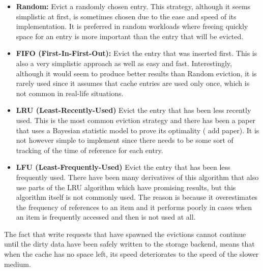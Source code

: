%
\begin{itemize}
	\item \textbf{Random:} Evict a randomly chosen entry. This strategy, 
		although it seems simplistic at first, is sometimes chosen due 
		to the ease and speed of its implementation. It is preferred in 
		random workloads where freeing quickly space for an entry is 
		more important than the entry that will be evicted.
	\item \textbf{FIFO (First-In-First-Out):} Evict the entry that was 
		inserted first. This is also a very simplistic approach as well 
		as easy and fast.  Interestingly, although it would seem to 
		produce better results than Random eviction, it is rarely used 
		since it assumes that cache entries are used only once, which 
		is not common in real-life situations.
	\item \textbf{LRU (Least-Recently-Used)}
		Evict the entry that has been less recently used. This is the 
		most common eviction strategy and there has been a paper that 
		uses a Bayesian statistic model to prove its optimality (\fixme 
		add paper). It is not however simple to implement since there 
		needs to be some sort of tracking of the time of reference for 
		each entry.
	\item \textbf{LFU (Least-Frequently-Used)}
		Evict the entry that has been less frequently used. There have 
		been many derivatives of this algorithm that also use parts of 
		the LRU algorithm which have promising results, but this 
		algorithm itself is
		not commonly used. The reason is because it overestimates the 
		frequency of references to an item and it performs poorly in 
		cases when an item is frequently accessed and then is not used 
		at all.
\end{itemize}


The fact that write requests that have spawned the evictions cannot continue 
until the dirty data have been safely written to the storage backend, means 
that when the cache has no space left, its speed deteriorates to the speed of 
the slower medium.

